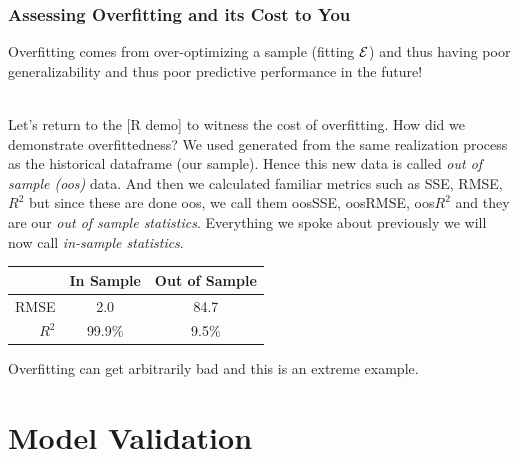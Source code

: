 \documentclass[handout]{beamer}
\begin{document}
\begin{frame}\frametitle{Assessing Overfitting and its Cost to You}
\small
Overfitting comes from over-optimizing a sample (fitting $\mathcal{E}$) and thus having poor generalizability and thus poor predictive performance in the future! \\~\\ \pause

Let's return to the [R demo] to witness the cost of overfitting. \pause How did we demonstrate overfittedness? \pause We used  generated from the same realization process as the historical dataframe (our sample). Hence this new data is called \emph{out of sample (oos)} data. And then we calculated familiar metrics such as SSE, RMSE, $R^2$ but since these are done oos, we call them oosSSE, oosRMSE, oos$R^2$ and they are our \emph{out of sample statistics}. Everything we spoke about previously we will now call \emph{in-sample statistics}.

\begin{table}
\centering
\begin{tabular}{rcc}
& In Sample & Out of Sample \\ \hline
RMSE   & 2.0 & 84.7 \\
$R^2$ & 99.9\% & 9.5\%
\end{tabular}
\end{table}

Overfitting can get arbitrarily bad and this is an extreme example.
	
\end{frame}

\section{Model Validation}
\end{document}

